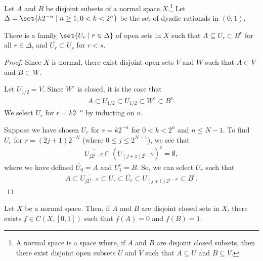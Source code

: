 \documentclass[10pt]{mypackage}
\begin{document}
\begin{lemma}
  Let $A$ and $B$ be disjoint subsets of a normal space $X$.\footnote{A normal space is a space where, if $A$ and $B$ are disjoint closed subsets, then there exist disjoint open subsets $U$ and $V$ such that $A\subseteq U$ and $B\subseteq V$.} Let $\Delta = \set{k2^{-n}\mid n\geq 1, 0 < k < 2^n}$ be the set of dyadic rationals in $\left(0,1\right)$.\newline

  There is a family $\set{U_r\mid r\in \Delta}$ of open sets in $X$ such that $A\subseteq U_r\subset B^{c}$ for all $r\in \Delta$, and $\overline{U_r}\subset U_s$ for $r < s$.
\end{lemma}
\begin{proof}
  Since $X$ is normal, there exist disjoint open sets $V$ and $W$ such that $A\subset V$ and $B\subset W$.\newline

  Let $U_{1/2} = V$. Since $W^{c}$ is closed, it is the case that
  \begin{align*}
    A\subset U_{1/2}\subset \overline{U_{1/2}}\subset W^{c}\subset B^{c}.
  \end{align*}
  We select $U_{r}$ for $r = k2^{-n}$ by inducting on $n$.\newline

  Suppose we have chosen $U_r$ for $r = k2^{-n}$ for $0 < k < 2^{n}$ and $n\leq N-1$. To find $U_r$ for $r = \left(2j+1\right)2^{-N}$ (where $0\leq j \leq 2^{N-1}$), we see that
  \begin{align*}
    \overline{U_{j2^{1-N}}}\cap \left(U_{\left(j+1\right)2^{1-N}}\right)^c = \emptyset,
  \end{align*}
  where we have defined $\overline{U_0}= A$ and $U_1^c = B$. So, we can select $U_{r}$ such that
  \begin{align*}
    A\subset \overline{U_{j2^{1-N}}}\subset U_r \subset \overline{U_r} \subset U_{\left(j+1\right)2^{1-N}}\subset B^{c}.
  \end{align*}
\end{proof}
\begin{theorem}
  Let $X$ be a normal space. Then, if $A$ and $B$ are disjoint closed sets in $X$, there exists $f\in C\left(X,[0,1]\right)$ such that $f(A) = 0$ and $f(B) = 1$.
\end{theorem}
\end{document}

